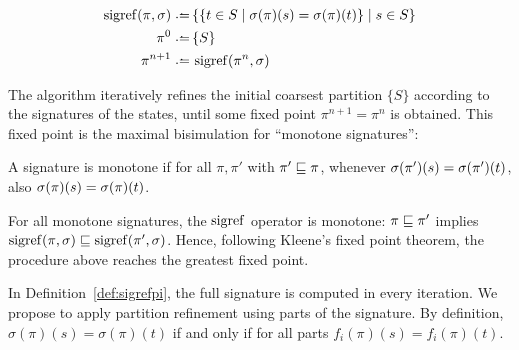 \begin{definition}
\label{def:sigrefpi}
\setlength{\abovedisplayskip}{0.4em}
\setlength{\belowdisplayskip}{0pt}
\begin{align*}
\sigref(\pi,\sig) \defeq\, & \{\{t\in S\mid \sig(\pi)(s) = \sig(\pi)(t)\}\mid s\in S\} \\
\pi^0 \defeq\, & \{S\} \\
\pi^{n+1} \defeq\, & \sigref(\pi^n, \sig) \\
\end{align*}
\end{definition}
\vspace{-1.5em}

The algorithm iteratively refines the initial coarsest partition $\{S\}$ according to the signatures of the states, until some fixed point $\pi^{n+1}=\pi^{n}$ is obtained.
%
This fixed point is the maximal bisimulation for ``monotone signatures'':

\begin{definition}
A signature is monotone if for all $\pi,\pi'$ with $\pi'\sqsubseteq\pi$, whenever $\sigma(\pi')(s)=\sigma(\pi')(t)$, also $\sigma(\pi)(s)=\sigma(\pi)(t)$. 
\end{definition}
For all monotone signatures, the $\operatorname{sigref}$ operator is monotone: $\pi\sqsubseteq\pi'$ implies $\operatorname{sigref}(\pi,\sigma)\sqsubseteq\operatorname{sigref}(\pi',\sigma)$. 
Hence, following Kleene's fixed point theorem, the procedure above reaches the greatest fixed point. 

In Definition~\ref{def:sigrefpi}, the full signature is computed in every iteration.
We propose to apply partition refinement using parts of the signature. By definition,
$\sigma(\pi)(s)=\sigma(\pi)(t)$ if and only if for all parts $f_i(\pi)(s)=f_i(\pi)(t)$.

